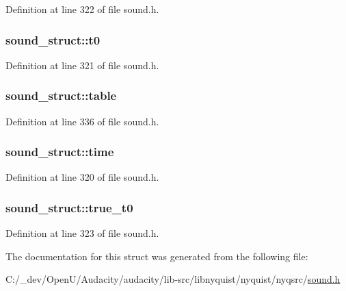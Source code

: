 Definition at line 322 of file sound.\+h.

\subsubsection[{\texorpdfstring{t0}{t0}}]{ sound\+\_\+struct\+::t0}\hypertarget{structsound__struct_a397d52ba2da4602200e85f49f62f28ea}{}\label{structsound__struct_a397d52ba2da4602200e85f49f62f28ea}


Definition at line 321 of file sound.\+h.

\subsubsection[{\texorpdfstring{table}{table}}]{ sound\+\_\+struct\+::table}\hypertarget{structsound__struct_a2f2f797cf14f3038124f9db72182452e}{}\label{structsound__struct_a2f2f797cf14f3038124f9db72182452e}


Definition at line 336 of file sound.\+h.

\subsubsection[{\texorpdfstring{time}{time}}]{ sound\+\_\+struct\+::time}\hypertarget{structsound__struct_a39c436490de5c9d9020a3c13cfdabcd2}{}\label{structsound__struct_a39c436490de5c9d9020a3c13cfdabcd2}


Definition at line 320 of file sound.\+h.

\subsubsection[{\texorpdfstring{true\+\_\+t0}{true_t0}}]{ sound\+\_\+struct\+::true\+\_\+t0}\hypertarget{structsound__struct_a7ec06c0b9e77d0e2ecd993df9f8eb6e3}{}\label{structsound__struct_a7ec06c0b9e77d0e2ecd993df9f8eb6e3}


Definition at line 323 of file sound.\+h.



The documentation for this struct was generated from the following file\+:\begin{DoxyCompactItemize}
\item 
C\+:/\+\_\+dev/\+Open\+U/\+Audacity/audacity/lib-\/src/libnyquist/nyquist/nyqsrc/\hyperlink{sound_8h}{sound.\+h}\end{DoxyCompactItemize}
